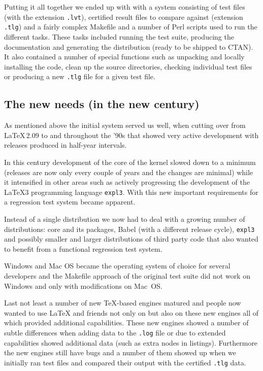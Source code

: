 \documentclass[a4paper]{ltugboat}
\begin{document}
Putting it all together we ended up with with a system consisting of
test files (with the extension \texttt{.lvt}), certified result files
to compare against (extension \texttt{.tlg}) and a fairly complex
Makefile and a number of Perl scripts used to run the different
tasks. These tasks included running the test suite, producing the
documentation and generating the distribution (ready to be shipped to
CTAN). It also contained a number of special functions such as
unpacking and locally installing the code, clean up the source
directories, checking individual test files or producing a new
\texttt{.tlg} file for a given test file.


\subsection{The new needs (in the new century)}

As mentioned above the initial system served us well, when cutting
over from \LaTeX\,2.09 to \LaTeXe{} and throughout the '90s that
showed very active \LaTeXe{} development with releases produced in
half-year intervals.

In this century development of the core of the \LaTeXe{} kernel slowed
down to a minimum (releases are now only every couple of years and the
changes are minimal) while it intensified in other areas such as
actively progressing the development of the \LaTeX3 programming
language \texttt{expl3}. With this new important requirements for a
regression test system became apparent.

Instead of a single distribution we now had to deal with a growing
number of distributions: core \LaTeXe{} and its packages, Babel (with
a different release cycle), \texttt{expl3} and possibly smaller and
larger distributions of third party code that also wanted to benefit
from a functional regression test system.

Windows and Mac OS became the operating system of choice for several
developers and the Makefile approach of the original test suite did not
work on Windows and only with modifications on Mac~OS.

Last not least a number of new \TeX-based engines matured and people
now wanted to use \LaTeX{} and friends not only on \pdfTeX{} but also
on these new engines all of which provided additional capabilities.
These new engines showed a number of subtle differences when adding
data to the \texttt{.log} file or due to extended capabilities showed
additional data (such as extra nodes in listings). Furthermore the new
engines still have bugs and a number of them showed up when we
initially ran test files and compared their output with the certified
\texttt{.tlg} data.
\end{document}
